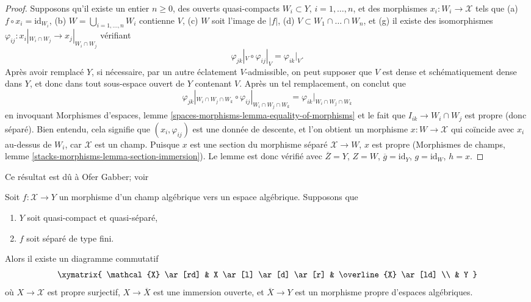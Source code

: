 \begin{proof}
\medskip\noindent
Supposons qu'il existe un entier $n \geq 0$, des ouverts quasi-compacts
$W_i \subset Y$, $i = 1, \ldots, n$, et des
morphismes $x_i : W_i \to \mathcal{X}$ tels que
(a) $f \circ x_i = \text{id}_{W_i}$,
(b) $W = \bigcup_{i = 1, \ldots, n} W_i$ contienne $V$,
(c) $W$ soit l'image de $|f|$,
(d) $V \subset W_1 \cap \ldots \cap W_n$, et
(g) il existe des isomorphismes
$\varphi_{ij} : x_i|_{W_i \cap W_j} \to x_j|_{W_i \cap W_j}$
vérifiant
$$
\varphi_{jk}|_V \circ \varphi_{ij}|_V = \varphi_{ik}|_V.
$$
Après avoir remplacé $Y$, si nécessaire, par un autre éclatement $V$-admissible,
on peut supposer que $V$ est dense et schématiquement dense
dans $Y$, et donc dans tout sous-espace ouvert de $Y$ contenant $V$.
Après un tel remplacement, on conclut que
$$
\varphi_{jk}|_{W_i \cap W_j \cap W_k} \circ
\varphi_{ij}|_{W_i \cap W_j \cap W_k} =
\varphi_{ik}|_{W_i \cap W_j \cap W_k}
$$
en invoquant Morphismes d'espaces, lemme
\ref{spaces-morphisms-lemma-equality-of-morphisms}
et le fait que $I_{ik} \to W_i \cap W_j$ est propre
(donc séparé).
Bien entendu, cela signifie que $(x_i, \varphi_{ij})$
est une donnée de descente, et l'on obtient un morphisme
$x : W \to \mathcal{X}$ qui coïncide avec $x_i$ au-dessus de $W_i$,
car $\mathcal{X}$ est un champ.
Puisque $x$ est une section du morphisme séparé
$\mathcal{X} \to W$, $x$ est propre
(Morphismes de champs, lemme \ref{stacks-morphisms-lemma-section-immersion}).
Le lemme est donc vérifié avec $\overline{Z} = Y$,
$Z = W$, $\overline{g} = \text{id}_Y$, $g = \text{id}_W$,
$h = x$.
\end{proof}

\begin{theorem}
\label{theorem-chow-finite-type}
\begin{reference}
Ce résultat est dû à Ofer Gabber; voir
\cite[Theorem 1.1]{olsson_proper}
\end{reference}
Soit $f : \mathcal{X} \to Y$ un morphisme d'un champ algébrique
vers un espace algébrique. Supposons que
\begin{enumerate}
\item $Y$ soit quasi-compact et quasi-séparé,
\item $f$ soit séparé de type fini.
\end{enumerate}
Alors il existe un diagramme commutatif
$$
\xymatrix{
\mathcal{X} \ar[rd] & X \ar[l] \ar[d] \ar[r] & \overline{X} \ar[ld] \\
& Y
}
$$
où $X \to \mathcal{X}$ est propre surjectif,
$X \to \overline{X}$ est une immersion ouverte, et
$\overline{X} \to Y$ est un morphisme propre d'espaces algébriques.
\end{theorem}


